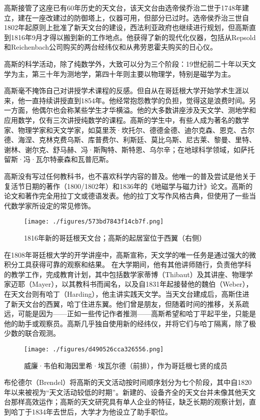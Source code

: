 高斯接管了这座已有60年历史的天文台，该天文台由选帝侯乔治二世于1748年建立，建在一座改建过的防御塔上，仪器可用，但部分已过时。选帝侯乔治三世自1802年起原则上批准了新天文台的建设，西法利亚政府也继续进行规划，但高斯直到1816年9月才得以搬到新的工作地点。他获得了新的现代化仪器，包括从Repsold和Reichenbach公司购买的两台经纬仪和从弗劳恩霍夫购买的日心仪。

高斯的科学活动，除了纯数学外，大致可以分为三个阶段：19世纪前二十年以天文学为主，第三十年为测地学，第四十年则主要以物理学，特别是磁学为主。

高斯毫不掩饰自己对讲授学术课程的反感。但自从在哥廷根大学开始学术生涯以来，他一直持续讲授直到1854年。他经常抱怨教学的负担，觉得这是浪费时间。另一方面，他偶尔也会称某些学生才华横溢。他的大多数讲座涉及天文学、测地学和应用数学，仅有三次讲授纯数学的课程。高斯的学生中，有些人成为著名的数学家、物理学家和天文学家，如莫里茨·坎托尔、德德金德、迪尔克森、恩克、古尔德、海涅、克林克费乌斯、库普费尔、利斯廷、莫比乌斯、尼古莱、黎曼、里特、谢林、谢尔克、舒马赫、冯·斯陶特、斯特恩、乌尔辛；在地球科学领域，如萨托留斯·冯·瓦尔特豪森和瓦普厄斯。

高斯没有写过任何教科书，也不喜欢科学内容的普及。他唯一的普及尝试是他关于复活节日期的著作（1800/1802年）和1836年的《地磁学与磁力计》论文。高斯的论文和著作完全用拉丁文或德语发表。他的拉丁文写作风格古典，但使用了一些当代数学家所设定的常见修饰。
\begin{figure}[ht]
\centering
\texttt{[image: ./figures/573bd7843f14cb7f.png]}
\caption{1816年新的哥廷根天文台；高斯的起居室位于西翼（右侧）} \label{fig_KRGS_6}
\end{figure}
在1808年哥廷根大学的开学讲座中，高斯宣称，天文学的唯一任务是通过强大的微积分工具获得可靠的观察和结果。 在大学期间，他有其他讲师随行，负责他学科的教学工作，完成教育计划，其中包括数学家蒂博（Thibaut）及其讲座、物理学家迈耶（Mayer），以其教科书而闻名，以及自1831年起接替他的魏伯（Weber），在天文台则有哈丁（Harding），他主讲实践天文学。当天文台建成后，高斯住进了新天文台的西翼，哈丁住进东翼。他们曾是朋友，但随着时间的推移，关系疏远，可能是因为——正如一些传记作者推测——高斯希望和哈丁平起平坐，只能是他的助手或观察员。高斯几乎独自使用新的经纬仪，并将它们与哈丁隔离，除了极少数的联合观测。
\begin{figure}[ht]
\centering
\texttt{[image: ./figures/d490526cca326556.png]}
\caption{威廉·韦伯和海因里希·埃瓦尔德（前排），作为哥廷根七贤的成员} \label{fig_KRGS_7}
\end{figure}
布伦德尔（Brendel）将高斯的天文活动按时间顺序划分为七个阶段，其中自1820年以来被视为“天文活动较低的时期”。新建的、设备齐全的天文台并未像其他天文台那样高效运作；高斯的天文研究具有单人企业的特征，缺乏长期的观察计划，直到哈丁于1834年去世后，大学才为他设立了助手职位。

